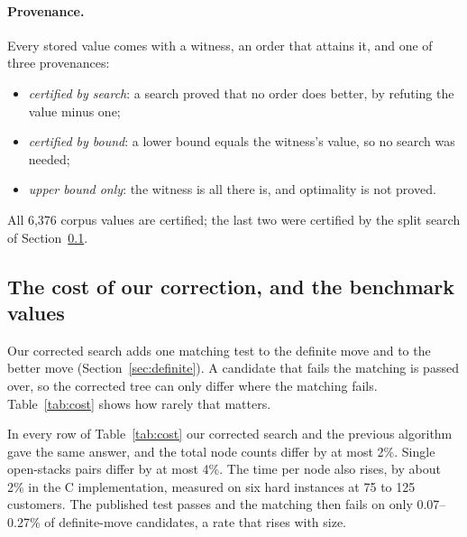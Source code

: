 \paragraph{Provenance.} Every stored value comes with a witness, an order that
attains it, and one of three provenances:
\begin{itemize}
\item \emph{certified by search}: a search proved that no order does better,
  by refuting the value minus one;
\item \emph{certified by bound}: a lower bound equals the witness's value, so
  no search was needed;
\item \emph{upper bound only}: the witness is all there is, and optimality is
  not proved.
\end{itemize}
All 6,376 corpus values are certified; the last two were certified by the
split search of Section~\ref{sec:practice}.

\subsection{The cost of our correction, and the benchmark values}
\label{sec:practice}

Our corrected search adds one matching test to the definite move and to the
better move (Section~\ref{sec:definite}). A candidate that fails the matching
is passed over, so the corrected tree can only differ where the matching fails.
Table~\ref{tab:cost} shows how rarely that matters.

\begin{table}[t]
\centering\small
\caption{Our correction never changed an answer and costs at most 2\% more
nodes in total. Each pair runs the same question under the previous algorithm and under the
corrected rules in one worker. Totals are over the pairs that finished under
both rules; a pair stopped by its budget says nothing about cost.
\emph{Vertices}: customers in the open-stacks rows (the vertices of $G_M$).
\emph{Largest pair ratio}: the largest ratio of corrected to previous nodes
over single pairs. Open-stacks pairs refute the optimum minus one, at 600\,s per
call at 50--100 customers and $2\times10^8$ nodes at 125. The graph pairs run
whole descents on VSPLIB, the colouring and named graphs, and a sample of 500
Rome graphs.}
\label{tab:cost}
\resizebox{\linewidth}{!}{}
\end{table}

In every row of Table~\ref{tab:cost} our corrected search and the previous algorithm gave
the same answer, and the total node counts differ by at most 2\%. Single
open-stacks pairs differ by at most 4\%. The time per node also rises, by about 2\% in the C
implementation, measured on six hard instances at 75 to 125 customers. The
published test passes and the matching then fails on only 0.07--0.27\% of
definite-move candidates, a rate that rises with size.

